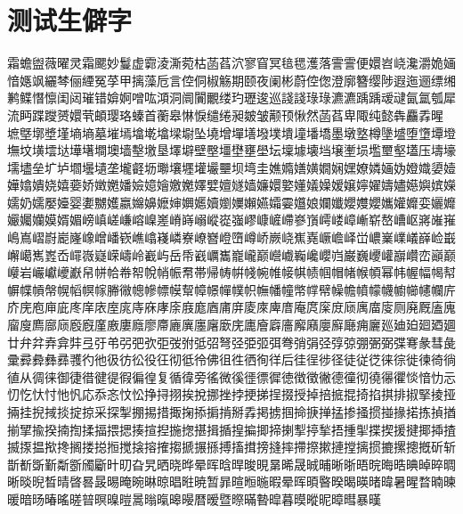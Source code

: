 \section{测试生僻字}

霜蟾盥薇曜灵霜颸妙鬘虚霩淩澌菀枯菡萏泬寥窅冥毰毸濩落霅霅便嬛岧峣瀺灂姽婳愔嫕飒纚棽俪緸冤莩甲摛藻卮言倥侗椒觞期颐夜阑彬蔚倥偬澄廓簪缨陟遐迤逦缥缃鹣鲽憯懔闺闼璀错媕婀噌吰澒洞阛闠覼缕玓瓑逡巡諓諓琭琭瀌瀌踽踽叆叇氤氲瓠犀流眄蹀躞赟嬛茕頔璎珞螓首蘅皋惏悷缱绻昶皴皱颟顸愀然菡萏卑陬纯懿犇麤掱暒 墌墍墎墏墐墒墒墓墔墕墖墘墖墚墛坠墝增墠墡墢墣墤墥墦墧墨墩墪樽墬墭堕墯墰墱墲坟墴墵垯墷墸墹墺墙墼墽垦墿壀壁壂壃壄壅壆坛壈壉壊垱壌壍埙壏壐壑壒压壔壕壖壗垒圹垆壛壜壝垄壠壡坜壣壤壥壦壧壨坝塆圭嫶嫷嫸嫹嫺娴嫼嫽嫾婳妫嬁嬂嬃嬄嬅嬆嬇娆嬉嬊娇嬍嬎嬏嬐嬑嬒嬓嬔嬕嬖嬗嬘嫱嬚嬛嬜嬞嬟嬠嫒嬢嬣嬥嬦嬧嬨嬩嫔嬫嬬奶嬬嬮嬯婴嬱嬲嬳嬴嬵嬶嬷婶嬹嬺嬻嬼嬽嬾嬿孀孁孂娘孄孅孆孇孆孈孉孊娈孋孊孍孎孏嫫婿媚嵭嵮嵯嵰嵱嵲嵳嵴嵵嵶嵷嵸嵹嵺嵻嵼嵽嵾嵿嶀嵝嶂嶃崭嶅嶆岖嶈嶉嶊嶋嶌嶍嶎嶏嶐嶑嶒嶓嵚嶕嶖嶘嶙嶚嶛嶜嶝嶞嶟峤嶡峣嶣嶤嶥嶦峄峃嶩嶪嶫嶬嶭崄嶯嶰嶱嶲嶳岙嶵嶶嶷嵘嶹岭嶻屿岳帋巀巁巂巃巄巅巆巇巈巉巊岿巌巍巎巏巐巑峦巓巅巕岩巗巘巙巚帠帡帢帣帤帨帩帪帬帯帰帱帲帴帵帷帹帺帻帼帽帾帿幁幂帏幄幅幆幇幈幉幊幋幌幍幎幏幐幑幒幓幖幙幚幛幜幝幞帜幠幡幢幤幥幦幧幨幩幪幭幮幯幰幱庍庎庑庖庘庛庝庠庡庢庣庤庥庨庩庪庬庮庯庰庱庲庳庴庵庹庺庻庼庽庿廀厕廃厩廅廆廇廋廌廍庼廏廐廑廒廔廕廖廗廘廙廛廜廞庑廤廥廦廧廨廭廮廯廰痈廲廵廸廹廻廼廽廿弁弅弆弇弉弖弙弚弜弝弞弡弢弣弤弨弩弪弫弬弭弮弰弲弪弴弶弸弻弼弽弿彖彗彘彚彛彜彝彞彟彴彵彶彷彸役彺彻彽彾佛徂徃徆徇徉后徍徎徏径徒従徔徕徖徙徚徛徜徝从徟徕御徢徣徤徥徦徧徨复循徫旁徭微徯徰徱徲徳徴徵徶德徸彻徺忁忂惔愔忇忈忉忔忕忖忚忛応忝忞忟忪挣挦挧挨挩挪挫挬挭挮挰掇授掉掊掋掍掎掐掑排掓掔掕挜掚挂掜掝掞掟掠采探掣掤掦措掫掬掭掮掯掰掱掲掳掴掵掶掸掹掺掻掼掽掾掿拣揁揂揃揅揄揆揇揈揉揊揋揌揍揎揑揓揔揕揖揗揘揙揤揥揦揧揨揫捂揰揱揲揳援揵揶揷揸揻揼揾揿搀搁搂搃搄搅搇搈搉搊搋搌搎搏搐搑搒摓摔摕摖摗摙摚摛掼摝摞摠摡斫斩斮斱斲斳斴斵斶斸旪旫旮旯晒晓晔晕晖晗晘晙晛晜晞晟晠晡晰晣晤晥晦晧晪晫晬晭晰晱晲晳晴晵晷晸晹晻晼晽晾晿暀暁暂暃暄暅暆暇晕晖暊暋暌暍暎暏暐暑暒暓暔暕暖暗旸暙暚暛暜暝暞暟暠暡暣暤暥暦暧暨暩暪暬暭暮暯暰昵暲暳暴暵
